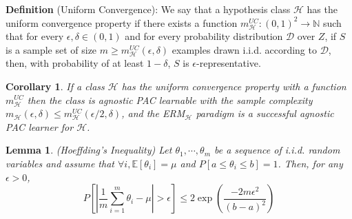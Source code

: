 \documentclass{article}
\newtheorem{lemma}{Lemma}
\newtheorem{corollary}{Corollary}
\begin{document}
\noindent\textbf{Definition} (Uniform Convergence): We say that a hypothesis class $\mathcal{H}$ has the uniform convergence property if there exists a function $m^{UC}_\mathcal{H}:(0,1)^2\rightarrow \mathbb{N}$ such that for every $\epsilon,\delta \in (0, 1)$ and for every probability distribution $\mathcal{D}$ over $Z$, if $S$ is a sample set of size $m\geq m^{UC}_\mathcal{H}(\epsilon, \delta)$ examples drawn i.i.d. according to $\mathcal{D}$, then, with probability of at least $1-\delta$, $S$ is $\epsilon$-representative.

	\begin{corollary}
	If a class $\mathcal{H}$ has the uniform convergence property with a function $m^{UC}_\mathcal{H}$ then the class is agnostic PAC learnable with the sample complexity $m_\mathcal{H}(\epsilon,\delta)\leq m^{UC}_\mathcal{H}(\epsilon/2,\delta)$, and the ERM$_\mathcal{H}$ paradigm is a successful agnostic PAC learner for $\mathcal{H}$.
	\end{corollary}
	
	\begin{lemma}
	(Hoeffding's Inequality) Let $\theta_1,\cdots,\theta_m$ be a sequence of i.i.d. random variables and assume that $\forall i, \mathbb{E}[\theta_i]=\mu$ and $P[a\leq\theta_i\leq b]=1$. Then, for any $\epsilon>0$,
	\begin{equation*}
	P\left[\left| \frac{1}{m}\sum_{i=1}^m\theta_i - \mu \right| >\epsilon \right] \leq 2 \exp \left( \frac{-2m\epsilon^2 }{(b-a)^2} \right)
	\end{equation*}
	\end{lemma}
\end{document}
